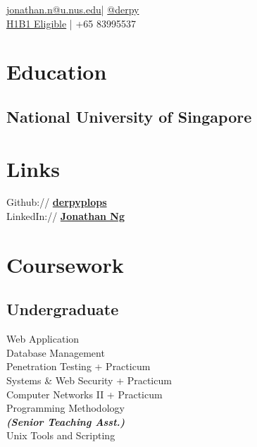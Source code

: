 \documentclass[]{deedy-resume-openfont}
\begin{document}
%
%
\lastupdated

%
%
 { \href{mailto:jonathan.n@u.nus.edu}{jonathan.n@u.nus.edu}| \href{http://t.me/derpy/}{@derpy}\\
\href{http://www.h1b1.com/practices/h-1b1-visa-for-chileans-singaporeans/}{H1B1 Eligible}
| +65 83995537
\\
}

%
%

\begin{minipage}[t]{0.33\textwidth}


\section{Education} 

\subsection{National University of Singapore}
\sectionsep



\section{Links} 
Github:// \href{https://github.com/derpyplops}{\bf derpyplops} \\
LinkedIn://  \href{https://www.linkedin.com/in/jonathan-ng-7061a3162/}{\bf Jonathan Ng} \\


\section{Coursework}

\subsection{Undergraduate}
Web Application \\
Database Management \\
Penetration Testing + Practicum \\
Systems \& Web Security + Practicum \\
Computer Networks II + Practicum \\
Programming Methodology \\
{\footnotesize \textit{\textbf{(Senior Teaching Asst.) }}} \\
Unix Tools and Scripting \\
\sectionsep


\end{minipage}
\end{document}
